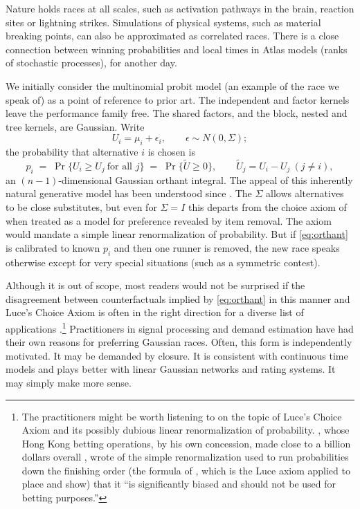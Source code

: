 \documentclass[11pt]{article}
\begin{document}
Nature holds races at all scales, such as activation pathways in the brain, reaction sites or lightning strikes. Simulations of physical systems, such as material breaking points, can also be approximated as correlated races. There is a close connection between winning probabilities and local times in Atlas models (ranks of stochastic processes), for another day.

We initially consider the multinomial probit model (an example of the race we speak of) as a point of reference to prior art. The independent and factor kernels leave the performance family free. The shared factors, and the block, nested and tree kernels, are Gaussian. Write
\begin{equation}
U_i = \mu_i + \epsilon_i, \qquad \epsilon\sim N(0,\Sigma);
\end{equation}
the probability that alternative $i$ is chosen is
\begin{equation}\label{eq:orthant}
p_i \;=\; \Pr\{U_i \ge U_j \ \text{for all } j\}
      \;=\; \Pr\{\tilde U \ge 0\},
\qquad \tilde U_j = U_i - U_j \ (j\ne i),
\end{equation}
an $(n-1)$-dimensional Gaussian orthant integral. The appeal of this inherently natural generative model has been understood since \citet{thurstone1927}. The $\Sigma$ allows alternatives to be close substitutes, but even for $\Sigma=I$ this departs from the choice axiom of \citet{luce1959} when treated as a model for preference revealed by item removal. The axiom would mandate a simple linear renormalization of probability. But if \eqref{eq:orthant} is calibrated to known $p_i$ and then one runner is removed, the new race speaks otherwise except for very special situations (such as a symmetric contest).

Although it is out of scope, most readers would not be surprised if the disagreement between counterfactuals implied by \eqref{eq:orthant} in this manner and Luce's Choice Axiom is often in the right direction for a diverse list of applications \citep{cottonsurvey}.\footnote{The practitioners might be worth listening to on the topic of Luce's Choice Axiom and its possibly dubious linear renormalization of probability. \citet{benter1994},
whose Hong Kong betting operations, by his own concession, made close to a
billion dollars overall \citep{chellel2018}, wrote of the simple
renormalization used to run probabilities down the finishing order (the
formula of \citet{harville1973}, which is the Luce axiom applied to place
and show)
that it ``is significantly biased and should not be used for betting
purposes.''} Practitioners in signal processing and demand estimation have had their own reasons for preferring Gaussian races. Often, this form is independently motivated. It may be demanded by closure. It is consistent with continuous time models and plays better with linear Gaussian networks and rating systems. It may simply make more sense.
\end{document}
